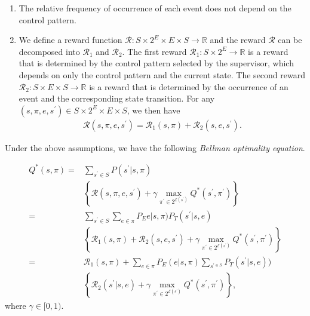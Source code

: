 \documentclass[letterpaper, 10 pt, conference]{ieeeconf}
\begin{document}
\begin{enumerate}
  \item The relative frequency of occurrence of each event does not depend on the control pattern.
  \item We define a reward function $\mathcal{R} : S \times 2^E \times E \times S \rightarrow \mathbb{R}$ and the reward $\mathcal{R}$ can be decomposed into $\mathcal{R}_1$ and $\mathcal{R}_2$. The first reward $\mathcal{R}_1 : S \times 2^E \rightarrow \mathbb{R}$ is a reward that is determined by the control pattern selected by the supervisor, which depends on only the control pattern and the current state. The second reward $\mathcal{R}_2 : S \times E \times S \rightarrow \mathbb{R}$ is a reward that is determined by the occurrence of an event and the corresponding state transition. For any $(s,\pi,e,s^{\prime}) \in S \times 2^E \times E \times S$, we then have
  \begin{align}
    \mathcal{R}(s,\pi,e,s^{\prime}) = \mathcal{R}_1(s,\pi) + \mathcal{R}_2(s,e,s^{\prime}).
  \end{align}
\end{enumerate}
Under the above assumptions, we have the following {\it Bellman optimality equation}.

\begin{align}
  Q^{\ast}(s,\pi) = & \sum_{s^{\prime} \in S} P(s^{\prime}|s,\pi)\nonumber \\
  & \left \{ \mathcal{R}(s,\pi,e,s^{\prime}) + \gamma \max_{\pi^{\prime} \in 2^{\mathcal{E}(s^{\prime})}} Q^{\ast}(s^{\prime},\pi^{\prime}) \right \} \nonumber \\
  = & \sum_{s^{\prime} \in S} \sum_{e \in \pi} P_Ee|s,\pi) P_T(s^{\prime}|s,e) \nonumber \\
  & \left \{ \mathcal{R}_1(s,\pi) + \mathcal{R}_2(s,e,s^{\prime}) + \gamma \max_{\pi^{\prime} \in 2^{\mathcal{E}(s^{\prime})}} Q^{\ast}(s^{\prime},\pi^{\prime}) \right \} \nonumber \\
  = & \mathcal{R}_1(s,\pi) + \sum_{e \in \pi} P_E(e|s,\pi) \sum_{s^{\prime \in S}} P_T(s^{\prime}|s,e)) \nonumber \\
  & \left \{ \mathcal{R}_2(s^{\prime}|s,e) + \gamma \max_{\pi^{\prime} \in 2^{\mathcal{E}(s^{\prime})}} Q^{\ast}(s^{\prime}, \pi^{\prime}) \right \},
\end{align}
where $\gamma \in [0,1)$.
\end{document}
